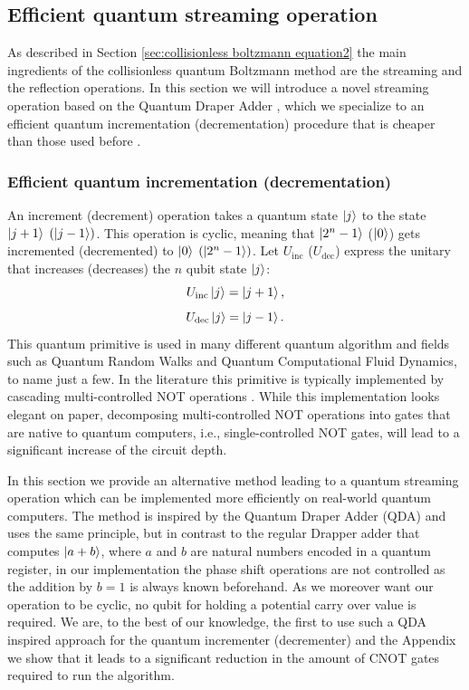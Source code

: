 \subsection{Efficient quantum streaming operation}\label{sec:efficient quantum convection operation}
As described in Section \ref{sec:collisionless boltzmann equation2} the main ingredients of the collisionless quantum Boltzmann method are the streaming and the reflection operations. In this section we will introduce a novel streaming operation based on the Quantum Draper Adder \cite{Draper1998}, which we specialize to an efficient quantum incrementation (decrementation) procedure that is cheaper than those used before \cite{Douglas2009,Fillion-Gourdea2017, Fillion-Gourdea2018,Todorova2020}. \\

\subsubsection{Efficient quantum incrementation (decrementation)}\label{ssec:efficient quantum incr}
An increment (decrement) operation takes a quantum state $\ket{j}$ to the state $\ket{j+1}$ $\left (\ket{j-1} \right )$. This operation is cyclic, meaning that $\ket{2^n-1}$ ($\ket{0}$) gets incremented (decremented) to $\ket{0}$ $\left (\ket{2^n-1} \right )$.  
Let $U_\text{inc}$ ($U_\text{dec}$) express the unitary that increases (decreases) the $n$ qubit state $\ket{j}$: 
\begin{equation}
    U_\text{inc} \ket{j} = \ket{j+1},
\end{equation}
\begin{equation}
    U_\text{dec} \ket{j} = \ket{j-1}.
\end{equation}
This quantum primitive is used in many different quantum algorithm and fields such as Quantum Random Walks and Quantum Computational Fluid Dynamics, to name just a few. In the literature this primitive is typically implemented by cascading multi-controlled NOT operations \cite{Douglas2009,Fillion-Gourdea2017, Fillion-Gourdea2018,Todorova2020, Budinski2021}. While this implementation looks elegant on paper, decomposing multi-controlled NOT operations into gates that are native to quantum computers, i.e., single-controlled NOT gates, will lead to a significant increase of the circuit depth. 

In this section we provide an alternative method leading to a quantum streaming operation which can be implemented more efficiently on real-world quantum computers. The method is inspired by the Quantum Draper Adder (QDA) \cite{Draper1998} and uses the same principle, but in contrast to the regular Drapper adder that computes $\ket{a + b}$, where $a$ and $b$ are natural numbers encoded in a quantum register, in our implementation the phase shift operations are not controlled as the addition by $b=1$ is always known beforehand. As we moreover want our operation to be cyclic, no qubit for holding a potential carry over value is required. We are, to the best of our knowledge, the first to use such a QDA inspired approach for the quantum incrementer (decrementer) and the Appendix we show that it leads to a significant reduction in the amount of CNOT gates required to run the algorithm. \\

